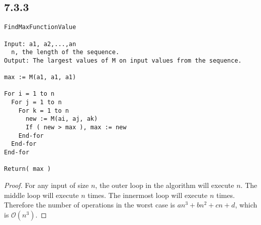 \subsection*{7.3.3}
\begin{lstlisting}
FindMaxFunctionValue

Input: a1, a2,...,an
  n, the length of the sequence.
Output: The largest values of M on input values from the sequence.

max := M(a1, a1, a1)

For i = 1 to n
  For j = 1 to n
    For k = 1 to n
      new := M(ai, aj, ak)
      If ( new > max ), max := new
    End-for
  End-for
End-for

Return( max )
\end{lstlisting}
\begin{enumerate}
  \begin{proof}
    For any input of size $n$, the outer loop in the algorithm will execute $n$. The middle loop will execute $n$ times. The innermost loop will execute $n$ times. Therefore the number of operations in the worst case is $an^3 + bn^2 + cn + d$, which is $\mathcal{O}(n^3)$.
  \end{proof}
\end{enumerate}

